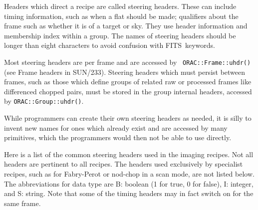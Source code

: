 \documentclass[twoside,11pt]{article}
\newcommand{\htmladdnormallink}[2]{#1}
\newcommand{\xref}[3]{#1}
\renewcommand{\_}{\texttt{\symbol{95}}}
\newcommand{\FITSref}{\htmladdnormallink{FITS}{http://fits.gsfc.nasa.gov/}}
\begin{document}
Headers which direct a recipe are called steering headers.  These can
include timing information, such as when a flat should be made;
qualifiers about the frame such as whether it is of a target or sky.
They use header information and membership index within a group.
The names of steering headers should be longer than eight characters
to avoid confusion with \FITSref\ keywords.

Most steering headers are per frame and are accessed by {\tt
ORAC::Frame::uhdr()} (see \xref{Frame headers in SUN/233}{sun233}{}).
Steering headers which must persist between frames, such as those
which define groups of related raw or processed frames like
differenced chopped pairs, must be stored in the group internal
headers, accessed by {\tt ORAC::Group::uhdr()}.

While programmers can create their own steering headers as needed, it
is silly to invent new names for ones which already exist and are
accessed by many primitives, which the programmers would then not be
able to use directly.

Here is a list of the common steering headers used in the imaging
recipes.  Not all headers are pertinent to all recipes.  The headers
used exclusively by specialist recipes, such as for Fabry-Perot
or nod-chop in a scan mode, are not listed below.  The
abbreviations for data type are B: boolean (1 for true, 0 for false),
I: integer, and S: string.  Note that some of the timing headers may
in fact switch on for the same frame.
\end{document}
